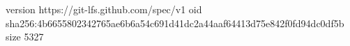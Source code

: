 version https://git-lfs.github.com/spec/v1
oid sha256:4b6655802342765ae6b6a54c691d41dc2a44aaf64413d75e842f0fd94dc0df5b
size 5327
